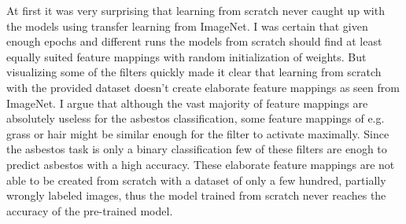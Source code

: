 At first it was very surprising that learning from scratch never caught up with the models using transfer learning from ImageNet. I was certain that given enough epochs and different runs the models from scratch should find at least equally suited feature mappings with random initialization of weights. But visualizing  some of the filters quickly made it clear that learning from scratch  with the provided dataset doesn't create elaborate feature mappings as seen from ImageNet. I argue that although the vast majority of feature mappings are absolutely useless for the asbestos classification, some feature mappings of e.g. grass or hair might be similar enough for the filter to activate maximally. Since the asbestos task is only a binary classification few of these filters are enogh to predict asbestos with a high accuracy. These elaborate feature mappings are not able to be created from scratch with a dataset of only a few hundred, partially wrongly labeled images, thus the model trained from scratch never reaches the accuracy of the pre-trained model.

